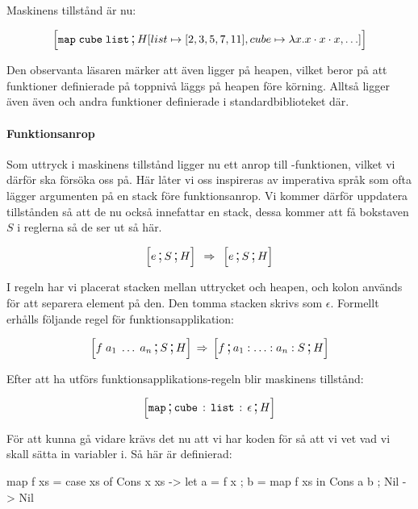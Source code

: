 \documentclass[../Core]{subfiles}
\begin{document}
Maskinens tillstånd är nu:

\begin{align*}
\text{\large$$}\Big[\mathtt{map\; cube\; list} \,\text{\Large;}\, H[list\mapsto[2,3,5,7,11],cube\mapsto\lambda x.x\cdot x\cdot x,\ldots]\Big]
\end{align*}


Den observanta läsaren märker att även  ligger på heapen, vilket
beror på att funktioner definierade på toppnivå läggs på heapen före körning.
Alltså ligger även även  och andra funktioner definierade
i standardbiblioteket där.

\paragraph{Funktionsanrop} Som uttryck i maskinens tillstånd ligger nu ett anrop till
-funktionen, vilket vi därför ska försöka oss på.
Här låter vi oss inspireras av imperativa språk som ofta lägger argumenten
på en stack före funktionsanrop. Vi kommer därför uppdatera tillstånden så att de
nu också innefattar en stack, dessa kommer att få bokstaven $S$ i reglerna så de
ser ut så här.

\begin{equation*} 
\text{\large$$}\Big[e \,\text{\Large;}\, S \,\text{\Large;}\, H\Big] \; \,\Rightarrow\, \; \text{\large$$}\Big[e \,\text{\Large;}\, S \,\text{\Large;}\, H\Big]
\end{equation*} 

I regeln har vi placerat stacken mellan uttrycket och heapen, och kolon används
för att separera element på den. Den tomma stacken skrivs som $\epsilon$.
Formellt erhålls följande regel för funktionsapplikation:

\[
\text{\large$$}\Big[f\; a_{1}\;\ldots\; a_{n}\,\text{\Large;}\, S \,\text{\Large;}\, H\Big]\,\Rightarrow\, \text{\large$$}\Big[f\,\text{\Large;}\, a_{1}:\ldots:a_{n}:S\,\text{\Large;}\, H\Big]
\]


Efter att ha utförs funktionsapplikations-regeln blir maskinens tillstånd:

\[
\text{\large$$}\Big[\mathtt{map} \,\text{\Large;}\, \mathtt{cube} \,:\, \mathtt{list} \,:\, \epsilon \,\text{\Large;}\, H\Big]
\]

För att kunna gå vidare krävs det nu att vi har koden för  så att vi vet
vad vi skall sätta in variabler i. Så här är  definierad:


\begin{codeEx}
map f xs = case xs of
    { Cons x xs -> let { a = f x
                       ; b = map f xs
                       } in Cons a b
    ; Nil       -> Nil
    }
\end{codeEx}
\end{document}
